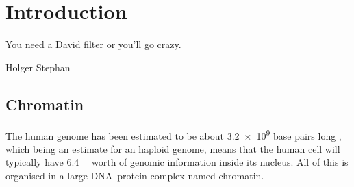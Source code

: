 \chapter{Introduction}
\label{ch:intro}

\epigraph{You need a David filter or you'll go crazy.}{Holger Stephan}


\section{Chromatin}

  The human genome has been estimated to be about \num{3.2e9}
  base pairs long \citep{nature-first-human-genome-draft}, which
  being an estimate for an haploid genome, means that the human cell will
  typically have \SI{6.4}{\giga\bp} worth of genomic information inside
  its nucleus.
  All of this is organised in a large DNA--protein complex named chromatin.

